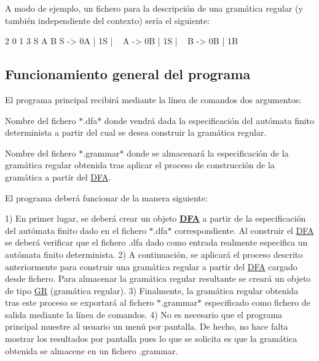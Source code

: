 A modo de ejemplo, un fichero para la descripción de una gramática regular (y también independiente del contexto) sería el siguiente\+:


\begin{DoxyCode}
2  
0 1  
3  
S A B  
S -> 0A | 1S | ~  
A -> 0B | 1S | ~  
B -> 0B | 1B
\end{DoxyCode}


\subsection*{Funcionamiento general del programa}

El programa principal recibirá mediante la línea de comandos dos argumentos\+:


\begin{DoxyItemize}
\item Nombre del fichero $\ast$.dfa$\ast$ donde vendrá dada la especificación del autómata finito determinista a partir del cual se desea construir la gramática regular.
\item Nombre del fichero $\ast$.grammar$\ast$ donde se almacenará la especificación de la gramática regular obtenida tras aplicar el proceso de construcción de la gramática a partir del \mbox{\hyperlink{class_d_f_a}{D\+FA}}.
\end{DoxyItemize}

El programa deberá funcionar de la manera siguiente\+:

1) En primer lugar, se deberá crear un objeto {\bfseries \mbox{\hyperlink{class_d_f_a}{D\+FA}}} a partir de la especificación del autómata finito dado en el fichero $\ast$.dfa$\ast$ correspondiente. Al construir el \mbox{\hyperlink{class_d_f_a}{D\+FA}} se deberá verificar que el fichero .dfa dado como entrada realmente especifica un autómata finito determinista. 2) A continuación, se aplicará el proceso descrito anteriormente para construir una gramática regular a partir del \mbox{\hyperlink{class_d_f_a}{D\+FA}} cargado desde fichero. Para almacenar la gramática regular resultante se creará un objeto de tipo \mbox{\hyperlink{class_g_r}{GR}} (gramática regular). 3) Finalmente, la gramática regular obtenida tras este proceso se exportará al fichero $\ast$.grammar$\ast$ especificado como fichero de salida mediante la línea de comandos. 4) No es necesario que el programa principal muestre al usuario un menú por pantalla. De hecho, no hace falta mostrar los resultados por pantalla pues lo que se solicita es que la gramática obtenida se almacene en un fichero .grammar.

